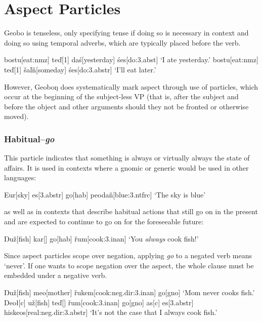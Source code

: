 \documentclass[a4paper,11pt,oneside,openany]{memoir}
\newcommand{\vd}{ď}
\newcommand{\vz}{ž}
\newcommand{\vs}{š}
\newcommand{\vr}{ř}
\newcommand{\vl}{ľ}
\newcommand{\vn}{ň}
\newcommand{\Engma}{Ŋ}
\begin{document}

\section{Aspect Particles}

Geobo{\engma} is tenseless, only specifying tense if doing so is necessary in context and doing so using temporal adverbs, which are typically placed before the verb.

\pex 
\a 
\begingl 
bostu[eat:{\sc nmz}]
te\vd[1]
da\'s[yesterday]
\'ses[do:{\sc 3.abst}]
\glft `I ate yesterday.'
\endgl
\a 
\begingl 
bostu[eat:{\sc nmz}]
te\vd[1]
\vs a\vl\vn[someday]
\'ses[do:{\sc 3.abstr}]
\glft `I'll eat later.'
\endgl 
\xe

However, Geoboŋ does systematically mark aspect through use of particles, which occur at the beginning of the subject-less VP (that is, after the subject and before the object and other arguments should they not be fronted or otherwise moved).


\subsubsection{Habitual--\textit{go}}

This particle indicates that something is always or virtually always the state of affairs. It is used in contexts where a gnomic or generic would be used in other languages:

\ex
\begingl
Eu\engma r[sky]
es[\sc 3.abstr]
go[\sc hab]
peoda\vn[blue:{\sc 3.ntfrc}]
\glft `The sky is blue'
\endgl
\xe

as well as in contexts that describe habitual actions that still go on in the present and are expected to continue to go on for the foreseeable future:

\ex 
\begingl
\Engma u\vz[fish]
kar[]
go[\sc hab]
\vr um[cook:{\sc 3.inan}]
\nogloss{!}
\glft `You \emph{always} cook fish!'
\endgl
\xe

Since aspect particles scope over negation, applying \textit{go} to a negated verb means `never'. If one wants to scope negation over the aspect, the whole clause must be embedded under a negative verb.

\pex 
\a 
\begingl
\Engma u\vz[fish]
meo[mother]
\vr ukem[cook:{\sc neg.dir:3.inan}]
go[\sc gno]
\glft `Mom never cooks fish.'
\endgl
\a 
\begingl
Deo\l[\sc c]
\engma u\vz[fish]
te\vd[]
\vr um[cook:{\sc 3.inan}]
go[\sc gno]
\nogloss{,}
as[\sc c]
es[\sc 3.abstr]
his\engma keos[real:{\sc neg.dir:3.abstr}]
\glft `It's not the case that I always cook fish.'
\endgl
\xe
\end{document}
